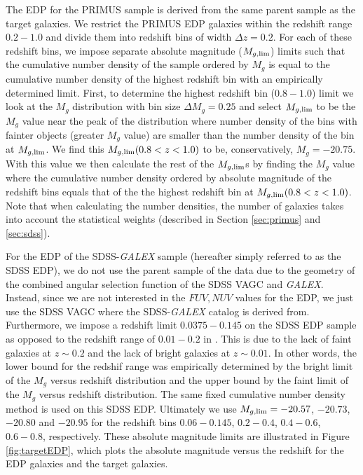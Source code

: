 \documentclass{emulateapj}
\begin{document}
The EDP for the PRIMUS sample is derived from the same parent sample as the target galaxies. 
We restrict the PRIMUS EDP galaxies within the redshift range $0.2-1.0$ and divide them into redshift bins of width $\Delta z = 0.2$. 
For each of these redshift bins, we impose separate absolute magnitude ($M_{g,\rm{lim}}$) limits such 
that the cumulative number density of the sample ordered by $M_{g}$ is equal to the cumulative 
number density of the highest redshift bin with an empirically determined limit. 
First, to determine the highest redshift bin ($0.8-1.0$) limit we look at the $M_{g}$ distribution with bin size
$\Delta M_{g} = 0.25$ and select $M_{g,\rm{lim}}$ to be the $M_{g}$ value near the peak of the 
distribution where number density of the bins with fainter objects (greater $M_{g}$ value) are smaller
than the number density of the bin at $M_{g, \rm{lim}}$. 
We find this $M_{g, \rm{lim}}( 0.8 < z < 1.0)$ to be, conservatively, $M_{g} = -20.75$. 
With this value we then calculate the rest of the $M_{g, \rm{lim}}$s by finding the
$M_{g}$ value where the cumulative number density ordered by absolute magnitude of the redshift bins 
equals that of the the highest redshift bin at $M_{g, \rm{lim}}( 0.8 < z < 1.0)$. 
Note that when calculating the number densities, the number of galaxies takes into account the 
statistical weights (described in Section \ref{sec:primus} and \ref{sec:sdss}).

For the EDP of the SDSS-{\em GALEX} sample (hereafter simply referred to as the SDSS EDP), 
we do not use the parent sample of the data due to 
the geometry of the combined angular selection function of the SDSS VAGC and {\em GALEX}. 
Instead, since we are not interested in the $FUV, NUV$ values for the EDP, we just use the
SDSS VAGC where the SDSS-{\em GALEX} catalog is derived from. 
Furthermore, we impose a redshift limit $0.0375-0.145$ on the SDSS EDP sample as opposed 
to the redshift range of $0.01-0.2$ in \cite{Moustakas:2013aa}.
This is due to the lack of faint galaxies at $z \sim 0.2$ and the lack of bright 
galaxies at $z \sim 0.01$. 
In other words, the lower bound for the redshif range was empirically determined by the bright limit of 
the $M_{g}$ versus redshift distribution and the upper bound by the faint limit of the 
$M_{g}$ versus redshift distribution. 
The same fixed cumulative number density method is used on this SDSS EDP. 
Ultimately we use $M_{g,\rm{lim}} = -20.57$, $-20.73$, $-20.80$ and $-20.95$ for the redshift bins 
$0.06-0.145$, $0.2-0.4$, $0.4-0.6$, $0.6-0.8$, respectively. 
These absolute magnitude limits are illustrated in Figure \ref{fig:targetEDP}, which plots the absolute magnitude versus the redshift for the EDP galaxies and the target galaxies. 
\end{document}
